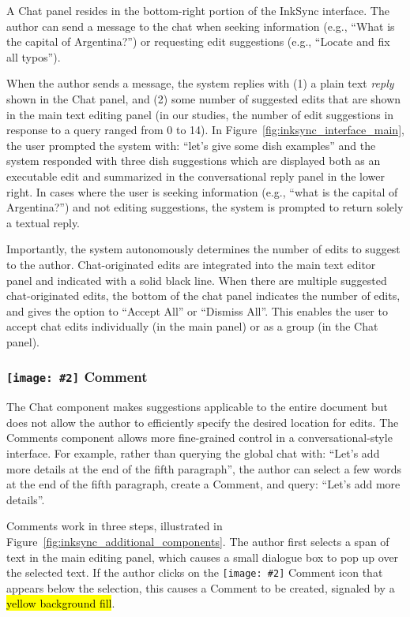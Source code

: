 \documentclass[manuscript]{acmart}
\DeclareRobustCommand{\hlcomment}[1]{{\sethlcolor{colorcomment}\hl{#1}}}
\newcommand{\symbolimg}[2][0.4cm]{%
  \texttt{[image: \#2]}%
}
\begin{document}
A Chat panel resides in the bottom-right portion of the InkSync interface. The author can send a message to the chat when seeking information (e.g., ``What is the capital of Argentina?'') or requesting edit suggestions (e.g., ``Locate and fix all typos'').

When the author sends a message, the system replies with (1) a plain text \textit{reply} shown in the Chat panel, and (2) some number of suggested edits that are shown in the main text editing panel (in our studies, the number of edit suggestions in response to a query ranged from 0 to 14). In Figure~\ref{fig:inksync_interface_main}, the user prompted the system with: ``let's give some dish examples'' and the system responded with three dish suggestions which are displayed both as an executable edit and summarized in the conversational reply panel in the lower right. In cases where the user is seeking information (e.g., ``what is the capital of Argentina?'') and not editing suggestions, the system is prompted to return solely a textual reply.

Importantly, the system autonomously determines the number of edits to suggest to the author.
Chat-originated edits are integrated into the main text editor panel and indicated with a solid black line. When there are multiple suggested chat-originated edits, the bottom of the chat panel indicates the number of edits, and gives the option to ``Accept All'' or ``Dismiss All''. This enables the user to accept chat edits individually (in the main panel) or as a group (in the Chat panel).

\subsubsection{\symbolimg{figures/icons/comment.png} Comment} \label{sec:comment}

The Chat component makes suggestions applicable to the entire document but does not allow the author to efficiently specify the desired location for edits.
The Comments component allows more fine-grained control in a conversational-style interface. 
For example, rather than querying the global chat with: ``Let's add more details at the end of the fifth paragraph'', the author can select a few words at the end of the fifth paragraph, create a Comment, and query: ``Let's add more details''.

Comments work in three steps, illustrated in Figure~\ref{fig:inksync_additional_components}. The author first selects a span of text in the main editing panel, which causes a small dialogue box to pop up over the selected text. If the author clicks on the \symbolimg[0.3cm]{figures/icons/comment.png} Comment icon that appears below the selection, this causes a Comment to be created, signaled by a \hlcomment{yellow background fill}.
\end{document}
